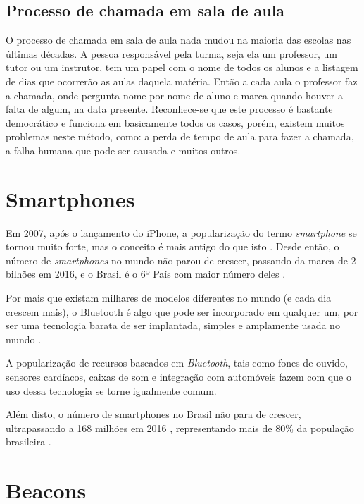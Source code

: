 \documentclass[
	12pt,
	oneside,
	a4paper,
	english,
	brazil,
]{abntex2}
\begin{document}
\subsection{Processo de chamada em sala de aula}

O processo de chamada em sala de aula nada mudou na maioria das escolas nas últimas décadas. A pessoa responsável pela turma, seja ela um professor, um tutor ou um instrutor, tem um papel com o nome de todos os alunos e a listagem de dias que ocorrerão as aulas daquela matéria. Então a cada aula o professor faz a chamada, onde pergunta nome por nome de aluno e marca quando houver a falta de algum, na data presente. Reconhece-se que este processo é bastante democrático e funciona em basicamente todos os casos, porém, existem muitos problemas neste método, como: a perda de tempo de aula para fazer a chamada, a falha humana que pode ser causada e muitos outros.

\section{Smartphones}

Em 2007, após o lançamento do iPhone, a popularização do termo \emph{smartphone} se tornou muito forte, mas o conceito é mais antigo do que isto \cite{smartphone-history-pictures}. Desde então, o número de \emph{smartphones} no mundo não parou de crescer, passando da marca de 2 bilhões em 2016, e o Brasil é o 6º País com maior número deles \cite{smartphone-numbers}.

Por mais que existam milhares de modelos diferentes no mundo (e cada dia crescem mais), o Bluetooth é algo que pode ser incorporado em qualquer um, por ser uma tecnologia barata de ser implantada, simples e amplamente usada no mundo \cite{smartphone-android-models}.

A popularização de recursos baseados em \emph{Bluetooth}, tais como fones de ouvido, sensores cardíacos, caixas de som e integração com automóveis fazem com que o uso dessa tecnologia se torne igualmente comum.

Além disto, o número de smartphones no Brasil não para de crescer, ultrapassando a 168 milhões em 2016 \cite{smartphone-brazil-numbers}, representando mais de 80\% da população brasileira \cite{brazil-population-numbers}.

\section{Beacons}
\end{document}
